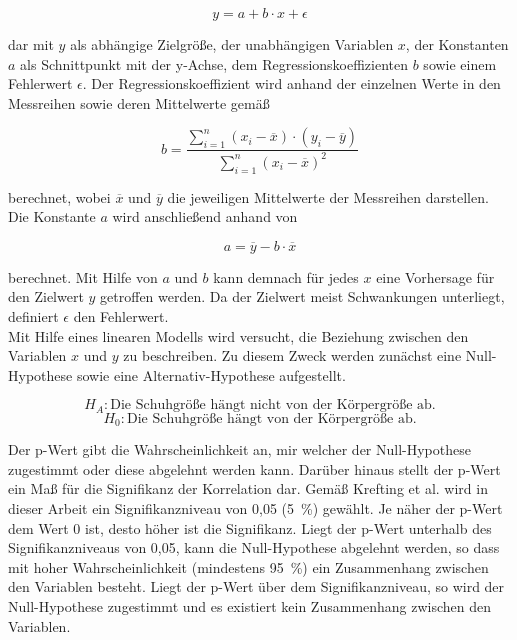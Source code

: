 \begin{equation}
y = a + b \cdot x + \epsilon
	\label{eq:linreg}
\end{equation}

dar mit $y$ als abhängige Zielgröße, der unabhängigen Variablen $x$, der Konstanten $a$ als Schnittpunkt mit der y-Achse, dem Regressionskoeffizienten $b$ sowie einem Fehlerwert $\epsilon$. Der Regressionskoeffizient wird anhand der einzelnen Werte in den Messreihen sowie deren Mittelwerte gemäß

\begin{equation}
b = \frac{\sum \limits_{i=1}^n(x_i-\overline{x}) \cdot (y_i-\overline{y})}{\sum \limits_{i=1}^n(x_i-\overline{x})^2} 
	\label{eq:regcoef}
\end{equation}

berechnet, wobei $\overline{x}$ und $\overline{y}$ die jeweiligen Mittelwerte der Messreihen darstellen. Die Konstante $a$ wird anschließend anhand von 

\begin{equation}
a = \overline{y} - b \cdot \overline{x}
	\label{eq:konstante}
\end{equation}

berechnet. Mit Hilfe von $a$ und $b$ kann demnach für jedes $x$ eine Vorhersage für den Zielwert $y$ getroffen werden. Da der Zielwert meist Schwankungen unterliegt, definiert $\epsilon$ den Fehlerwert. \parencite{frank_einfach_2006}\\

Mit Hilfe eines linearen Modells wird versucht, die Beziehung zwischen den Variablen $x$ und $y$ zu beschreiben. Zu diesem Zweck werden zunächst eine Null-Hypothese sowie eine Alternativ-Hypothese aufgestellt.

\begin{equation}
H_A: \text{Die Schuhgröße hängt nicht von der Körpergröße ab}. \nonumber
\end{equation}
\begin{equation}
H_0: \text{Die Schuhgröße hängt von der Körpergröße ab}.
	\label{eq:null-hypo}
\end{equation}

Der p-Wert gibt die Wahrscheinlichkeit an, mir welcher der Null-Hypothese zugestimmt oder diese abgelehnt werden kann. Darüber hinaus stellt der p-Wert ein Maß für die Signifikanz der Korrelation dar. Gemäß Krefting et al. wird in dieser Arbeit ein Signifikanzniveau von 0,05 (5~\%) gewählt. Je näher der p-Wert dem Wert 0 ist, desto höher ist die Signifikanz. Liegt der p-Wert unterhalb des Signifikanzniveaus von 0,05, kann die Null-Hypothese abgelehnt werden, so dass mit hoher Wahrscheinlichkeit (mindestens 95~\%) ein Zusammenhang zwischen den Variablen besteht. Liegt der p-Wert über dem Signifikanzniveau, so wird der Null-Hypothese zugestimmt und es existiert kein Zusammenhang zwischen den Variablen. \parencite{frank_einfach_2006}

